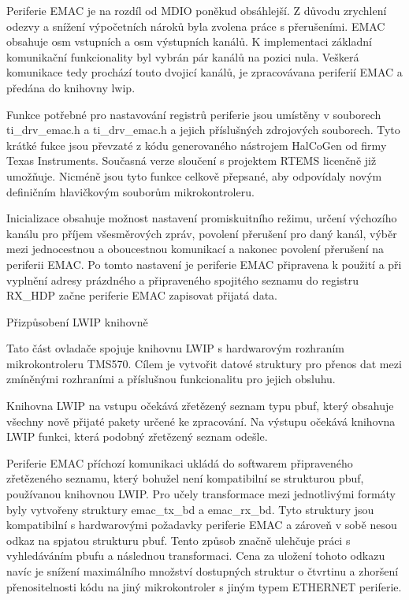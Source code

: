 Periferie EMAC je na rozdíl od MDIO poněkud obsáhlejší.
Z důvodu zrychlení odezvy a snížení výpočetních nároků byla zvolena práce s přerušeními.
EMAC obsahuje osm vstupních a osm výstupních kanálů.
K implementaci základní komunikační funkcionality byl vybrán pár kanálů na pozici nula.
Veškerá komunikace tedy prochází touto dvojicí kanálů, je zpracovávana periferií EMAC a předána do knihovny lwip.

Funkce potřebné pro nastavování registrů periferie jsou umístěny v souborech ti\_drv\_emac.h a ti\_drv\_emac.h a jejich příslušných zdrojových souborech.
Tyto krátké fukce jsou převzaté z kódu generovaného nástrojem HalCoGen od firmy Texas Instruments.
Současná verze sloučení s projektem RTEMS licenčně již umožňuje.
Nicméně jsou tyto funkce celkově přepsané, aby odpovídaly novým definičním hlavičkovým souborům mikrokontroleru.

Inicializace obsahuje možnost nastavení promiskuitního režimu, určení výchozího kanálu pro příjem všesměrových zpráv, povolení přerušení pro daný kanál, výběr mezi jednocestnou a oboucestnou komunikací a nakonec povolení přerušení na periferii EMAC.
Po tomto nastavení je periferie EMAC připravena k použití a při vyplnění adresy prázdného a připraveného spojitého seznamu do registru RX\_HDP začne periferie EMAC zapisovat přijatá data.

\secc Přizpůsobení LWIP knihovně

Tato část ovladače spojuje knihovnu LWIP s hardwarovým rozhraním mikrokontroleru TMS570.
Cílem je vytvořit datové struktury pro přenos dat mezi zmíněnými rozhraními a příslušnou funkcionalitu pro jejich obsluhu.

Knihovna LWIP na vstupu očekává zřetězený seznam typu pbuf, který obsahuje všechny nově přijaté pakety určené ke zpracování.
Na výstupu očekává knihovna LWIP funkci, která podobný zřetězený seznam odešle.  

Periferie EMAC příchozí komunikaci ukládá do softwarem připraveného zřetězeného seznamu, který bohužel není kompatibilní se strukturou pbuf, používanou knihovnou LWIP.
Pro učely transformace mezi jednotlivými formáty byly vytvořeny struktury emac\_tx\_bd a emac\_rx\_bd.
Tyto struktury jsou kompatibilní s hardwarovými požadavky periferie EMAC a zároveň v sobě nesou odkaz na spjatou strukturu pbuf.
Tento způsob značně ulehčuje práci s vyhledáváním pbufu a následnou transformaci.
Cena za uložení tohoto odkazu navíc je snížení maximálního množství dostupných struktur o čtvrtinu a zhoršení přenositelnosti kódu na jiný mikrokontroler s jiným typem ETHERNET periferie.

